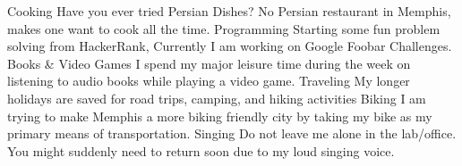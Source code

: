 



\begin{cvskills}
  \cvskill
    {Cooking} %
    {Have you ever tried Persian Dishes? No Persian restaurant in Memphis, makes one want to cook all the time.} %
  \cvskill
    {Programming} %
    {Starting some fun problem solving from HackerRank, Currently I am working on Google Foobar Challenges.} %
  \cvskill
    {Books \& Video Games} %
    {I spend my major leisure time during the week on listening to audio books while playing a video game.} %
  \cvskill
    {Traveling} %
    {My longer holidays are saved for road trips, camping, and hiking activities} %
  \cvskill
    {Biking} %
    {I am trying to make Memphis a more biking friendly city by taking my bike as my primary means of transportation.} %
  \cvskill
    {Singing} %
    {Do not leave me alone in the lab/office. You might suddenly need to return soon due to my loud singing voice.} %
\end{cvskills}